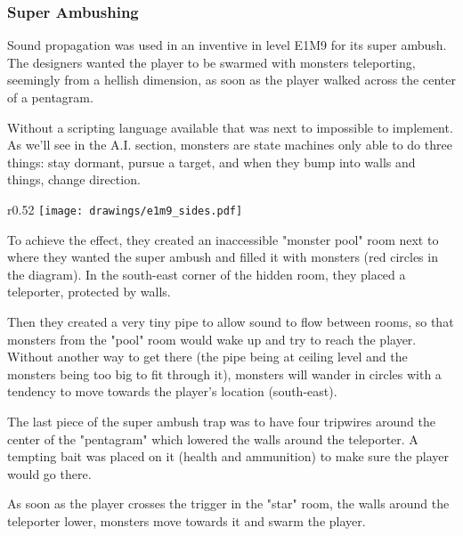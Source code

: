 \subsubsection{Super Ambushing}
Sound propagation was used in an inventive in level E1M9 for its super ambush.  The designers wanted the player to be swarmed with monsters teleporting, seemingly from a hellish dimension, as soon as the player walked across the center of a pentagram.\\
\par
 Without a scripting language available that was next to impossible to implement. As we'll see in the A.I. section, monsters are state machines only able to do three things: stay dormant, pursue a target, and when they bump into walls and things, change direction.\\
\par
\begin{wrapfigure}[24]{r}{0.52\textwidth}
\centering
\texttt{[image: drawings/e1m9\_sides.pdf]}
\end{wrapfigure}

\par

To achieve the effect, they created an inaccessible "monster pool" room next to where they wanted the super ambush and filled it with monsters (red circles in the diagram). In the south-east corner of the hidden room, they placed a teleporter, protected by walls.\\
\par
Then they created a very tiny pipe to allow sound to flow between rooms, so that monsters from the "pool" room would wake up and try to reach the player. Without another way to get there (the pipe being at ceiling level and the monsters being too big to fit through it), monsters will wander in circles with a tendency to move towards the player's location (south-east).\\
\par
The last piece of the super ambush trap was to have four tripwires around the center of the "pentagram" which lowered the walls around the teleporter. A tempting bait was placed on it (health and ammunition) to make sure the player would go there.\\
\par

As soon as the player crosses the trigger in the "star" room, the walls around the teleporter lower, monsters move towards it and swarm the player. \\
\par
{}







